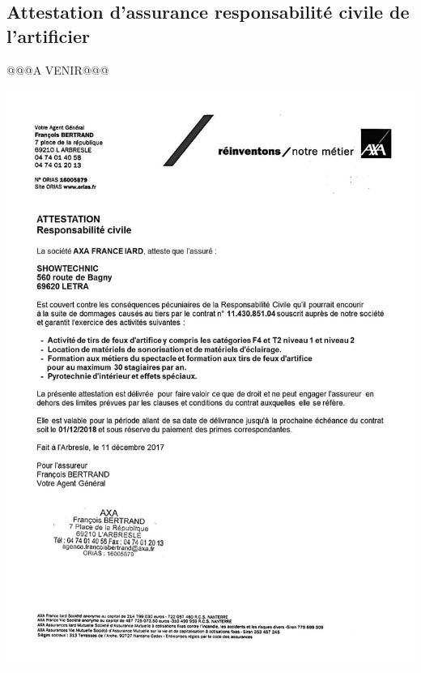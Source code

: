 \documentclass[hidelinks, paper=a4, fontsize=13pt]{report}
\begin{document}
\subsection{Attestation d’assurance responsabilité civile de l’artificier}
@@@A VENIR@@@
\begin{center}
	\includegraphics[scale=0.70,keepaspectratio]{Annexes/Documents/AttestationAssuranceShowtechnic}
\end{center}
\end{document}
